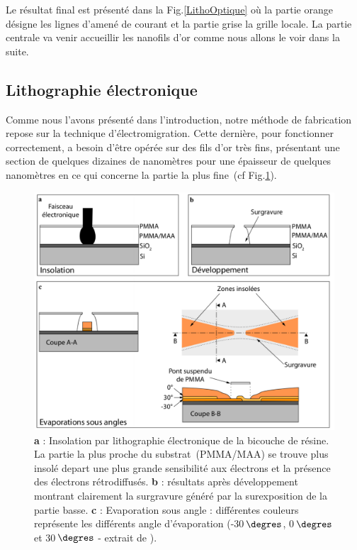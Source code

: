 Le résultat final est présenté dans la Fig.\ref{LithoOptique} où la partie orange désigne les lignes d'amené de courant et la partie grise la grille locale. La partie centrale va venir accueillir les nanofils d'or comme nous allons le voir dans la suite.


\subsection{Lithographie électronique}



Comme nous l'avons présenté dans l'introduction, notre méthode de fabrication repose sur la technique d'électromigration. Cette dernière, pour fonctionner correctement, a besoin d'\^etre opérée sur des fils d'or très fins, présentant une section de quelques dizaines de nanomètres pour une épaisseur de quelques nanomètres en ce qui concerne la partie la plus fine~(cf Fig.\ref{EvapAngle}). 

\begin{figure}[h!]
\centering \includegraphics[scale=0.45]{Fabrication/EvapAngle/EvapAngle.pdf}
\caption{\textbf{a} : Insolation par lithographie électronique de la bicouche de résine. La partie la plus proche du substrat~(PMMA/MAA) se trouve plus insolé depart une plus grande sensibilité aux électrons et la présence des électrons rétrodiffusés. \textbf{b} : résultats après développement montrant clairement la surgravure généré par la surexposition de la partie basse. \textbf{c} : Evaporation sous angle : différentes couleurs représente les différents angle d'évaporation (-30$\,\degres$, 0$\,\degres$ et 30$\,\degres$ - extrait de \cite{RochPhD}).}
\label{EvapAngle}
\end{figure}

